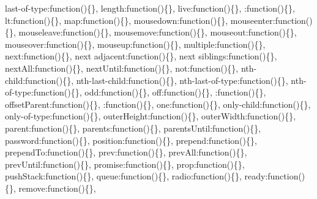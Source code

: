 {\begin{DoxyParamCaption}
\textquotesingle{}last-\/of-\/type\textquotesingle{}\+:function()\{\}, \textquotesingle{}length\textquotesingle{}\+:function()\{\}, \textquotesingle{}live\textquotesingle{}\+:function()\{\}, \textquotesingle{}\+:function()\{\}, \textquotesingle{}lt\textquotesingle{}\+:function()\{\}, \textquotesingle{}map\textquotesingle{}\+:function()\{\}, \textquotesingle{}mousedown\textquotesingle{}\+:function()\{\}, \textquotesingle{}mouseenter\textquotesingle{}\+:function()\{\}, \textquotesingle{}mouseleave\textquotesingle{}\+:function()\{\}, \textquotesingle{}mousemove\textquotesingle{}\+:function()\{\}, \textquotesingle{}mouseout\textquotesingle{}\+:function()\{\}, \textquotesingle{}mouseover\textquotesingle{}\+:function()\{\}, \textquotesingle{}mouseup\textquotesingle{}\+:function()\{\}, \textquotesingle{}multiple\textquotesingle{}\+:function()\{\}, \textquotesingle{}next\textquotesingle{}\+:function()\{\}, \textquotesingle{}next adjacent\textquotesingle{}\+:function()\{\}, \textquotesingle{}next siblings\textquotesingle{}\+:function()\{\}, \textquotesingle{}next\+All\textquotesingle{}\+:function()\{\}, \textquotesingle{}next\+Until\textquotesingle{}\+:function()\{\}, \textquotesingle{}not\textquotesingle{}\+:function()\{\}, \textquotesingle{}nth-\/child\textquotesingle{}\+:function()\{\}, \textquotesingle{}nth-\/last-\/child\textquotesingle{}\+:function()\{\}, \textquotesingle{}nth-\/last-\/of-\/type\textquotesingle{}\+:function()\{\}, \textquotesingle{}nth-\/of-\/type\textquotesingle{}\+:function()\{\}, \textquotesingle{}odd\textquotesingle{}\+:function()\{\}, \textquotesingle{}off\textquotesingle{}\+:function()\{\}, \textquotesingle{}\+:function()\{\}, \textquotesingle{}offset\+Parent\textquotesingle{}\+:function()\{\}, \textquotesingle{}\+:function()\{\}, \textquotesingle{}one\textquotesingle{}\+:function()\{\}, \textquotesingle{}only-\/child\textquotesingle{}\+:function()\{\}, \textquotesingle{}only-\/of-\/type\textquotesingle{}\+:function()\{\}, \textquotesingle{}outer\+Height\textquotesingle{}\+:function()\{\}, \textquotesingle{}outer\+Width\textquotesingle{}\+:function()\{\}, \textquotesingle{}parent\textquotesingle{}\+:function()\{\}, \textquotesingle{}parents\textquotesingle{}\+:function()\{\}, \textquotesingle{}parents\+Until\textquotesingle{}\+:function()\{\}, \textquotesingle{}password\textquotesingle{}\+:function()\{\}, \textquotesingle{}position\textquotesingle{}\+:function()\{\}, \textquotesingle{}prepend\textquotesingle{}\+:function()\{\}, \textquotesingle{}prepend\+To\textquotesingle{}\+:function()\{\}, \textquotesingle{}prev\textquotesingle{}\+:function()\{\}, \textquotesingle{}prev\+All\textquotesingle{}\+:function()\{\}, \textquotesingle{}prev\+Until\textquotesingle{}\+:function()\{\}, \textquotesingle{}promise\textquotesingle{}\+:function()\{\}, \textquotesingle{}prop\textquotesingle{}\+:function()\{\}, \textquotesingle{}push\+Stack\textquotesingle{}\+:function()\{\}, \textquotesingle{}queue\textquotesingle{}\+:function()\{\}, \textquotesingle{}radio\textquotesingle{}\+:function()\{\}, \textquotesingle{}ready\textquotesingle{}\+:function()\{\}, \textquotesingle{}remove\textquotesingle{}\+:function()\{\}, 
\end{DoxyParamCaption}}
